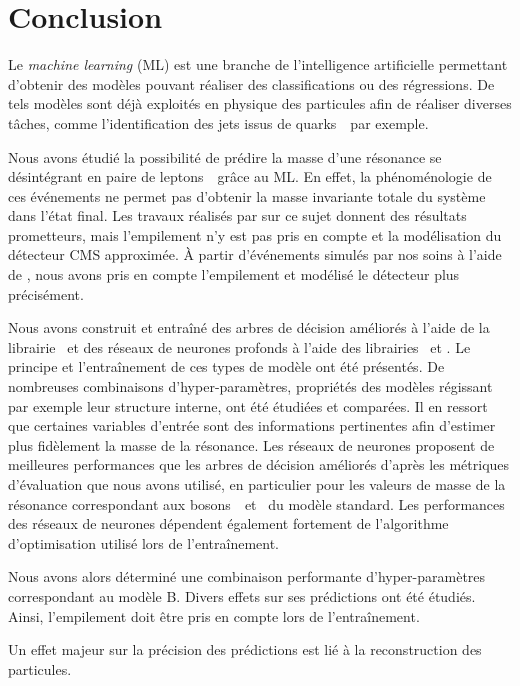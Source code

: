 \section{Conclusion}\label{chapter-ML-section-conclusion}
Le \emph{machine learning} (ML) est une branche de l'intelligence artificielle
permettant d'obtenir des modèles pouvant réaliser des classifications ou des régressions.
De tels modèles sont déjà exploités en physique des particules afin de réaliser diverses tâches,
comme l'identification des jets issus de quarks~\quarkb\ par exemple.
\par
Nous avons étudié la possibilité de prédire la masse d'une résonance se désintégrant en paire de leptons~\tau\ grâce au ML.
En effet, la phénoménologie de ces événements ne permet pas d'obtenir la masse invariante totale du système dans l'état final.
Les travaux réalisés par \citeauthor{BARTSCHI201929} sur ce sujet donnent des résultats prometteurs,
mais l'empilement n'y est pas pris en compte et la modélisation du détecteur CMS approximée.
À partir d'événements simulés par nos soins à l'aide de \FASTSIM,
nous avons pris en compte l'empilement et modélisé le détecteur plus précisément.
\par
Nous avons construit et entraîné
des arbres de décision améliorés
à l'aide de la librairie \XGBOOST\
et
des réseaux de neurones profonds
à l'aide des librairies \KERAS\ et \TENSORFLOW.
Le principe et l'entraînement de ces types de modèle ont été présentés.
De nombreuses combinaisons d'hyper-paramètres,
propriétés des modèles régissant par exemple leur structure interne,
ont été étudiées et comparées.
Il en ressort que certaines variables d'entrée sont des informations pertinentes %
afin d'estimer plus fidèlement la masse de la résonance.
Les réseaux de neurones
proposent de meilleures performances que
les arbres de décision améliorés
d'après les métriques d'évaluation que nous avons utilisé,
en particulier pour les valeurs de masse de la résonance correspondant aux bosons~\Zboson\ et \higgs\ du modèle standard.
Les performances des réseaux de neurones dépendent également fortement de l'algorithme d'optimisation utilisé lors de l'entraînement.
\par
Nous avons alors déterminé une combinaison performante d'hyper-paramètres correspondant au modèle B.
Divers effets sur ses prédictions ont été étudiés.
Ainsi, l'empilement doit être pris en compte lors de l'entraînement.
\par
Un effet majeur sur la précision des prédictions est lié à la reconstruction des particules.
